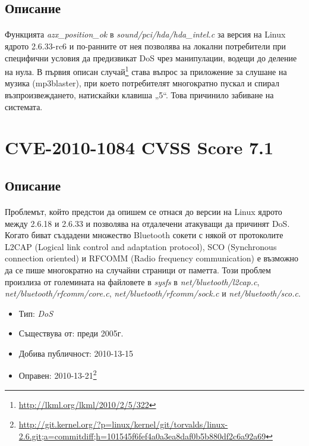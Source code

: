 \documentclass[a4paper,12pt,leqno]{article}
\begin{document}
\subsection{Описание}
\paragraph{}
Функцията \textit{azx\_position\_ok} в \textit{sound/pci/hda/hda\_intel.c} за версия на Linux ядрото 
2.6.33-rc6 и по-ранните от нея позволява на локални потребители при 
специфични условия да предизвикат DoS чрез манипулации, водещи до 
деление на нула. В първия описан случай\footnote{\url{http://lkml.org/lkml/2010/2/5/322}}
 става въпрос за приложение за 
слушане на музика (mp3blaster), при което потребителят многократно пускал 
и спирал възпроизвеждането, натискайки клавиша „5“. Това причинило 
забиване на системата.


\section{CVE-2010-1084 CVSS Score 7.1}
\subsection{Описание}
\paragraph{}
Проблемът, който предстои да опишем се отнася до версии на Linux ядрото 
между 2.6.18 и 2.6.33 и позволява на отдалечени атакуващи да причинят DoS. 
Когато биват създадени множество Bluetooth сокети с някой от протоколите 
L2CAP (Logical link control and adaptation protocol), SCO (Synchronous connection 
oriented) и RFCOMM (Radio frequency communication) е възможно да се пише 
многократно на случайни страници от паметта. Този проблем произлиза от 
големината на файловете в \textit{sysfs} в \textit{net/bluetooth/l2cap.c}, 
\textit{net/bluetooth/rfcomm/core.c}, \textit{net/bluetooth/rfcomm/sock.c} и \textit{net/bluetooth/sco.c}. 

\begin{itemize}
    \item Тип: \textit{DoS}
    \item Съществува от: преди 2005г.
  	\item Добива публичност: 2010-13-15
    \item Оправен: 2010-13-21\footnote{\url{http://git.kernel.org/?p=linux/kernel/git/torvalds/linux-2.6.git;a=commitdiff;h=101545f6fef4a0a3ea8daf0b5b880df2c6a92a69}}
\end{itemize}
\end{document}
